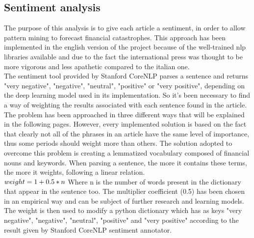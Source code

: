 \subsection{Sentiment analysis}
The purpose of this analysis is to give each article a sentiment, in order to allow pattern mining to forecast financial catastrophes. This approach has been implemented in the english version of the project because of the well-trained nlp libraries available and due to the fact the international press was thought to be more vigorous and less apathetic compared to the italian one. \\
The sentiment tool provided by Stanford CoreNLP parses a sentence and returns "very negative", "negative", "neutral", "positive" or "very positive", depending on the deep learning model \cite{sentimentdeep} used in its implementation. So it's been necessary to find a way of weighting the results associated with each sentence found in the article. \\
The problem has been approached in three different ways that will be explained in the following pages.
However, every implemented solution is based on the fact that clearly not all of the phrases in an article have the same level of importance, thus some periods should weight more than others. The solution adopted to overcome this problem is creating a lemmatized vocabulary composed of financial nouns and keywords. When parsing a sentence, the more it contains these terms, the more it weights, following a linear relation. \\
\begin{math}
weight = 1 + 0.5*n \\
\end{math}
Where n is the number of words present in the dictionary that appear in the sentence too.
The multiplier coefficient (0.5) has been chosen in an empirical way and can be subject of further research and learning models. \\
The weight is then used to modify a python dictionary which has as keys "very negative", "negative", "neutral", "positive" and "very positive" according to the result given by Stanford CoreNLP sentiment annotator. 

